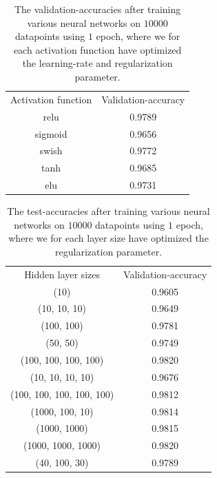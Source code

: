 \documentclass{article}
\begin{document}
\begin{table}
	\centering
	\begin{tabular}{| c | c |}
		Activation function & Validation-accuracy \\
		relu                & 0.9789              \\
		sigmoid             & 0.9656              \\
		swish               & 0.9772              \\
		tanh                & 0.9685              \\
		elu                 & 0.9731
	\end{tabular}
	\caption{The validation-accuracies after training various neural networks on
		$10 000$ datapoints using $1$ epoch, where we for each activation function
		have optimized the learning-rate and regularization parameter.}
	\label{nnactivres}
\end{table}
\begin{table}
	\centering
	\begin{tabular}{| c | c |}
		Hidden layer sizes        & Validation-accuracy \\
		(10)                      & 0.9605              \\
		(10, 10, 10)              & 0.9649              \\
		(100, 100)                & 0.9781              \\
		(50, 50)                  & 0.9749              \\
		(100, 100, 100, 100)      & 0.9820              \\
		(10, 10, 10, 10)          & 0.9676              \\
		(100, 100, 100, 100, 100) & 0.9812              \\
		(1000, 100, 10)           & 0.9814              \\
		(1000, 1000)              & 0.9815              \\
		(1000, 1000, 1000)        & 0.9820              \\
		(40, 100, 30)             & 0.9789
	\end{tabular}
	\caption{The test-accuracies after training various neural networks on
		$10 000$ datapoints using $1$ epoch, where we for each layer
		size have optimized the regularization parameter.}
	\label{nnsizeres}
\end{table}
\end{document}
